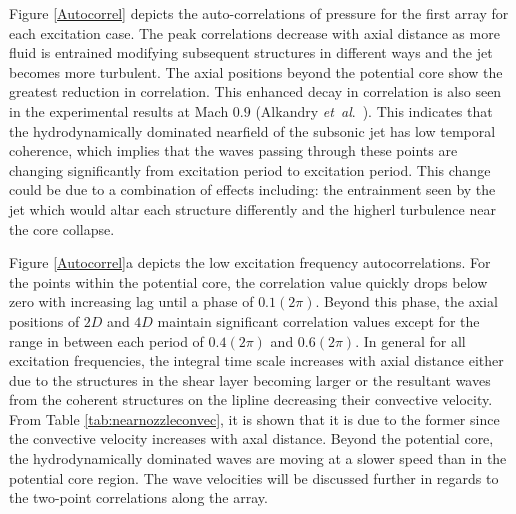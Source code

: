 \documentclass[english]{aiaa-tc}
\newcommand*{\etal}{\textit{et~al}.\ }
\begin{document}
Figure \ref{Autocorrel} depicts the auto-correlations of pressure for the first array for each excitation case. The peak correlations decrease with axial distance as more fluid is entrained modifying subsequent structures in different ways and the jet becomes more turbulent. The axial positions beyond the potential core show the greatest reduction in correlation. This enhanced decay in correlation is also seen in the experimental results at Mach $0.9$ (Alkandry \etal \cite{Alkandry2013}). This indicates that the hydrodynamically dominated nearfield of the subsonic jet has low temporal coherence, which implies that the waves passing through these points are changing significantly from excitation period to excitation period. This change could be due to a combination of effects including: the entrainment seen by the jet which would altar each structure differently and the higherl turbulence near the core collapse.

Figure \ref{Autocorrel}a depicts the low excitation frequency autocorrelations. For the points within the potential core, the correlation value quickly drops below zero with increasing lag until a phase of $0.1(2\pi)$. Beyond this phase, the axial positions of $2D$ and $4D$ maintain significant correlation values except for the range in between each period of $0.4(2\pi)$ and $0.6(2\pi)$. In general for all excitation frequencies, the integral time scale increases with axial distance either due to the structures in the shear layer becoming larger  or the resultant waves from the coherent structures on the lipline decreasing their convective velocity. From Table \ref{tab:nearnozzleconvec}, it is shown that it is due to the former since the convective velocity increases with axal distance. Beyond the potential core, the hydrodynamically dominated waves are moving at a slower speed than in the potential core region. The wave velocities will be discussed further in regards to the two-point correlations along the array.
\end{document}

